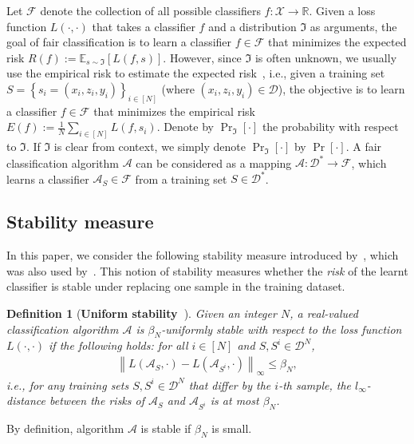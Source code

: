 \documentclass[11pt]{article}
\newcommand{\Exp}{\mathbb{E}}
\newtheorem{definition}[theorem]{Definition}
\newcommand{\calA}{\mathcal{A}}
\newcommand{\calD}{\mathcal{D}}
\newcommand{\calF}{\mathcal{F}}
\newcommand{\calX}{\mathcal{X}}
\begin{document}
	Let $\calF$ denote the collection of all possible classifiers $f:\calX\rightarrow \mathbb{R}$.
	Given a loss function $L(\cdot ,\cdot)$ that takes a classifier $f$ and a distribution $\Im$ as arguments, the goal of fair classification is to learn a classifier $f\in \calF$ that minimizes the expected risk 
	$
	R(f):=\Exp_{s\sim \Im} \left[L(f, s)\right].
	$
	However, since $\Im$ is often unknown, we usually use the empirical risk to estimate the expected risk~\cite{bousquet2002stability,shalev2010learnability,maurer2017second}, i.e., given a training set $S=\left\{s_i=\left(x_i,z_i,y_i\right)\right\}_{i\in [N]}$ (where $(x_i,z_i,y_i)\in \calD$), the objective is to learn a classifier $f\in \calF$ that minimizes the empirical risk 
	$E(f):=\frac{1}{N}\sum_{i\in [N]} L(f,s_i)$.
	Denote by $\Pr_{\Im}[\cdot]$ the probability with respect to $\Im$.
	If $\Im$ is clear from context, we simply denote $\Pr_{\Im}[\cdot]$ by $\Pr[\cdot]$.
	A fair classification algorithm $\calA$ can be considered as a mapping $\calA: \calD^*\rightarrow \calF$, which learns a classifier $\calA_S\in \calF$ from a training set $S\in \calD^*$.
	
	\subsection{Stability measure}
	\label{sec:uniform_stability}
	
	In this paper, we consider the following stability measure introduced by~\cite{bousquet2002stability}, which was also used by~\cite{shalev2010learnability,maurer2017second,meng2017generalization}. 
	This notion of stability measures whether the \emph{risk} of the learnt classifier is stable under  replacing one sample in the training dataset. 
	
	\begin{definition}[\textbf{Uniform stability~\cite{bousquet2002stability}}]
		\label{def:class_stability}
		Given an integer $N$, a real-valued classification algorithm $\calA$ is $\beta_N$-uniformly stable with respect to the loss function $L(\cdot,\cdot)$ if the following holds: for all $i\in [N]$ and $S, S^i\in \calD^N$,
		\begin{eqnarray*}
			\left\| L(\calA_S,\cdot)- L(\calA_{S^{i}},\cdot) \right\|_{\infty}  \leq \beta_N,
		\end{eqnarray*}
		i.e., for any training sets $S, S^i\in \calD^N$ that differ by the $i$-th sample, the $l_{\infty}$-distance between the risks of $\calA_S$ and $\calA_{S^{i}}$ is at most $\beta_N$.
	\end{definition}
	\noindent
	By definition, algorithm $\calA$ is stable if $\beta_N$ is small.
	
\end{document}
